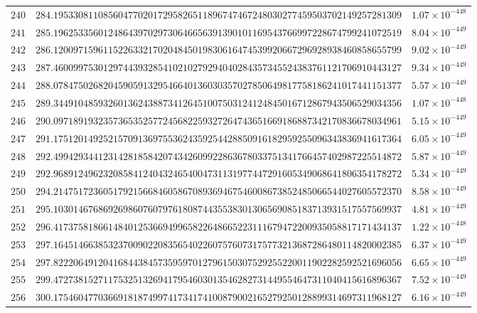 \documentclass[12pt,reqno]{amsart}
\theoremstyle{remark}
\begin{document}
\begin{longtable}{clc}
$240$ & $284.1953308110856047702017295826511896747467248030277459503702149257281309$ & $1.07\times 10^{-448}$ \\
$241$ & $285.1962533560124864397029730646656391390101169543766997228674799241072519$ & $8.04\times 10^{-449}$ \\
$242$ & $286.1200971596115226332170204845019830616474539920667296928938460858655799$ & $9.02\times 10^{-449}$ \\
$243$ & $287.4600997530129744393285410210279294040284357345524383761121706910443127$ & $9.34\times 10^{-449}$ \\
$244$ & $288.0784750268204590591329546640136030357027850649817758186241017441151377$ & $5.57\times 10^{-449}$ \\
$245$ & $289.3449104859326013624388734126451007503124124845016712867943506529034356$ & $1.07\times 10^{-448}$ \\
$246$ & $290.0971891932357365352577245682259327264743651669186887342170836678034961$ & $5.15\times 10^{-449}$ \\
$247$ & $291.1751201492521570913697553624359254428850916182959255096343836941617364$ & $6.05\times 10^{-449}$ \\
$248$ & $292.4994293441231428185842074342609922863678033751341766457402987225514872$ & $5.87\times 10^{-449}$ \\
$249$ & $292.9689124962320858412404324654004731131977447291605349068641806354178272$ & $5.34\times 10^{-449}$ \\
$250$ & $294.2147517236051792156684605867089369467546008673852485066544027605572370$ & $8.58\times 10^{-449}$ \\
$251$ & $295.1030146768692698607607976180874435538301306569085183713931517557569937$ & $4.81\times 10^{-449}$ \\
$252$ & $296.4173758186614840125366949965822648665223111679472200935058817171434137$ & $1.22\times 10^{-448}$ \\
$253$ & $297.1645146638532370090220835654022607576073175773213687286480114820002385$ & $6.37\times 10^{-449}$ \\
$254$ & $297.8222064912041684438457359597012796150307529255220011902282592521696056$ & $6.65\times 10^{-449}$ \\
$255$ & $299.4727381527117532513269417954603013546282731449554647311040415616896367$ & $7.52\times 10^{-449}$ \\
$256$ & $300.1754604770366918187499741734174100879002165279250128899314697311968127$ & $6.16\times 10^{-449}$ \\

\end{longtable}
\end{document}
